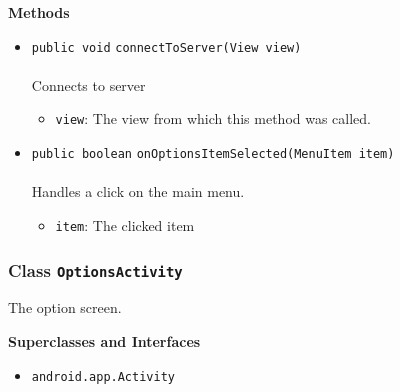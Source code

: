 \textbf{\sffamily Methods}
\begin{itemize}
\item \lstinline|public void| \lstinline|connectToServer|\lstinline|(View view)|\\ \\[-0.6em]
Connects to server
\begin{itemize}
\item \lstinline|view|: The view from which this method was called.
\end{itemize}



\item \lstinline|public boolean| \lstinline|onOptionsItemSelected|\lstinline|(MenuItem item)|\\ \\[-0.6em]
Handles a click on the main menu.
\begin{itemize}
\item \lstinline|item|: The clicked item
\end{itemize}



\end{itemize}

\subsubsection{Class \lstinline|OptionsActivity|}
The option screen. \\
\noindent\begin{minipage}[t]{5cm}
\vspace{0.3em}
\hspace*{2em}
\vspace{0.3em}
\end{minipage}



\textbf{\sffamily Superclasses and Interfaces}
\begin{itemize}
\item \lstinline|android.app.Activity|
\end{itemize}



